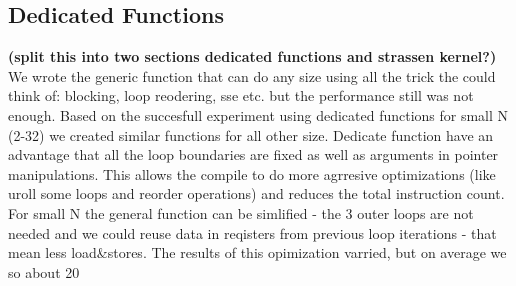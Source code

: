 \documentclass{article}
\begin{document}
\subsection{Dedicated Functions}
{\bf (split this into two sections dedicated functions and strassen kernel?) }
We wrote the generic function that can do any size using all the trick the could think of: blocking, loop reodering, sse etc. but the performance still was not enough. Based on the succesfull experiment using dedicated functions for small N (2-32) we created similar functions for all other size. Dedicate function have an advantage that all the loop boundaries are fixed as well as arguments in pointer manipulations. This allows the compile to do more agrresive optimizations (like uroll some loops and reorder operations) and reduces the total instruction count.  For small N  the general function can be simlified - the 3 outer loops are not needed and we could reuse data in reqisters from previous loop iterations  - that mean less load&stores. 
The results of this opimization varried, but on average we so about 20%
\end{document}
